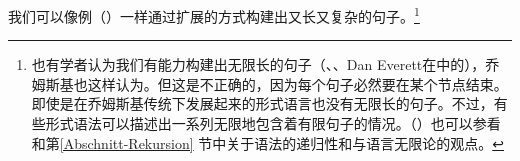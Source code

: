 \noindent
我们可以像例（）一样通过扩展的方式构建出又长又复杂的句子。\footnote{
也有学者认为我们有能力构建出无限长的句子（\citealp*[]{NKN2001a}、\citealp[]{KS2008a-u}、Dan Everett在中的），乔姆斯基也这样认为\citep[]{Leiss2003a}。但这是不正确的，因为每个句子必然要在某个节点结束。即使是在乔姆斯基传统下发展起来的形式语言也没有无限长的句子。不过，有些形式语法可以描述出一系列无限地包含着有限句子的情况。（\citealp[]{Chomsky57a}）也可以参看  和第\ref{Abschnitt-Rekursion} 节中关于语法的递归性和与语言无限论的观点。
}


